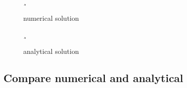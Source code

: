 \documentclass[a4paper, 16pt]{article}
\begin{document}
    \begin{figure}[!h]
¸    \caption{numerical solution}
        \label{fig: napaka}
    \end{figure}


    \begin{figure}[!h]
¸    \caption{analytical solution}
        \label{fig: heatana}
    \end{figure}

\newpage

\subsection{Compare numerical and analytical}
\end{document}
